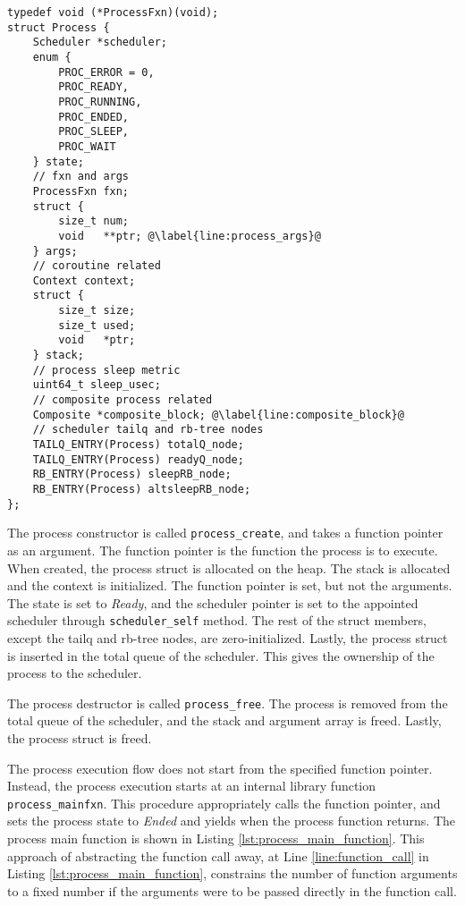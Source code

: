\begin{lstlisting}[style={CustomC},caption={Process struct type},label={lst:process_struct_type}]
typedef void (*ProcessFxn)(void);
struct Process {
    Scheduler *scheduler;
    enum {
        PROC_ERROR = 0,
        PROC_READY,
        PROC_RUNNING,
        PROC_ENDED,
        PROC_SLEEP,
        PROC_WAIT
    } state;
    // fxn and args 
    ProcessFxn fxn;
    struct {
        size_t num;
        void   **ptr; @\label{line:process_args}@
    } args;
    // coroutine related
    Context context;
    struct {
        size_t size;
        size_t used;
        void   *ptr;
    } stack;
    // process sleep metric
    uint64_t sleep_usec;
    // composite process related
    Composite *composite_block; @\label{line:composite_block}@
    // scheduler tailq and rb-tree nodes
    TAILQ_ENTRY(Process) totalQ_node;
    TAILQ_ENTRY(Process) readyQ_node;
    RB_ENTRY(Process) sleepRB_node;
    RB_ENTRY(Process) altsleepRB_node;
};
\end{lstlisting}

The process constructor is called \texttt{process\_create}, and takes a function pointer as an argument. The function pointer is the function the process is to execute. When created, the process struct is allocated on the heap. The stack is allocated and the context is initialized. The function pointer is set, but not the arguments. The state is set to \textit{Ready}, and the scheduler pointer is set to the appointed scheduler through \texttt{scheduler\_self} method. The rest of the struct members, except the tailq and rb\hyp{}tree nodes, are zero\hyp{}initialized. Lastly, the process struct is inserted in the total queue of the scheduler. This gives the ownership of the process to the scheduler. 

The process destructor is called \texttt{process\_free}. The process is removed from the total queue of the scheduler, and the stack and argument array is freed. Lastly, the process struct is freed.

The process execution flow does not start from the specified function pointer. Instead, the process execution starts at an internal library function \texttt{process\_mainfxn}. This procedure appropriately calls the function pointer, and sets the process state to \textit{Ended} and yields when the process function returns. The process main function is shown in Listing \ref{lst:process_main_function}. This approach of abstracting the function call away, at Line \ref{line:function_call} in Listing \ref{lst:process_main_function}, constrains the number of function arguments to a fixed number if the arguments were to be passed directly in the function call.

